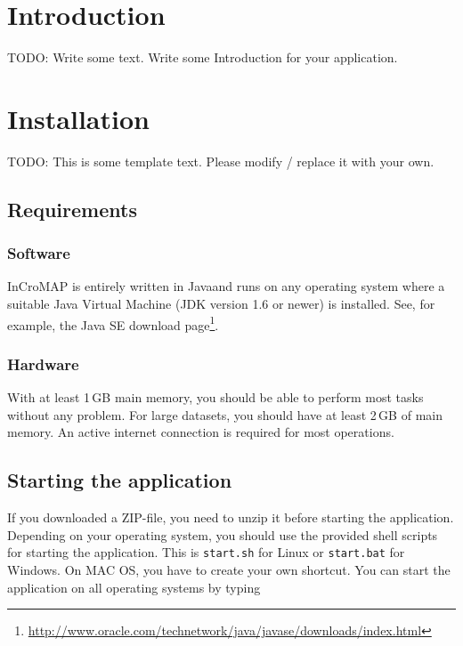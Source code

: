 \chapter{Introduction}

TODO: Write some text. Write some Introduction for your application.


\chapter{Installation}

TODO: This is some template text. Please modify / replace it with your own.


\section{Requirements}
\subsection{Software}

InCroMAP is entirely written in Java\TTra and runs on any operating system
where a suitable Java Virtual Machine (JDK version 1.6 or newer) is installed.
See, for example, the Java SE download
page\footnote{\url{http://www.oracle.com/technetwork/java/javase/downloads/index.html}\label{fn:jvmldl}}.

\subsection{Hardware}

With at least 1\,GB main memory, you should be able to perform most tasks
without any problem. For large datasets, you should have at least 2\,GB of main
memory. \newline An active internet connection is required for most operations.

\section{Starting the application}
\label{startingTheProgram}

If you downloaded a ZIP-file, you need to unzip it before starting the
application. Depending on your operating system, you should use the provided
shell scripts for starting the application. This is \texttt{start.sh} for Linux
or \texttt{start.bat} for Windows. On MAC OS, you have to create your own
shortcut. You can start the application on all operating systems by typing

